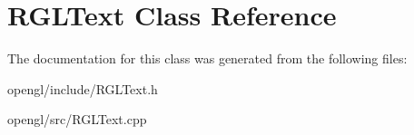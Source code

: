 \hypertarget{classRGLText}{
\section{RGLText Class Reference}
\label{classRGLText}
}


The documentation for this class was generated from the following files:\begin{DoxyCompactItemize}
\item 
opengl/include/RGLText.h\item 
opengl/src/RGLText.cpp\end{DoxyCompactItemize}
